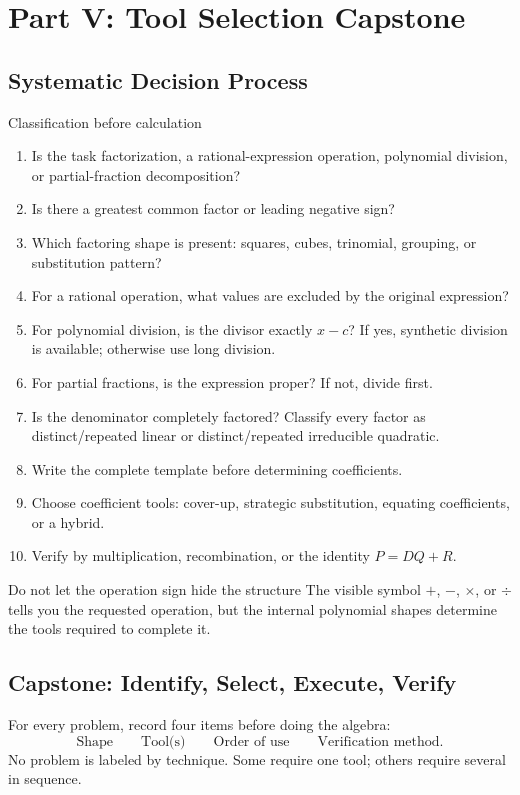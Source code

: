\documentclass[11pt,oneside]{book}
\begin{document}
\part{Part V: Tool Selection Capstone}
\chapter{Systematic Decision Process}
\begin{rulebox}{Classification before calculation}
\begin{enumerate}[leftmargin=*]
\item Is the task factorization, a rational-expression operation, polynomial division, or partial-fraction decomposition?
\item Is there a greatest common factor or leading negative sign?
\item Which factoring shape is present: squares, cubes, trinomial, grouping, or substitution pattern?
\item For a rational operation, what values are excluded by the original expression?
\item For polynomial division, is the divisor exactly $x-c$? If yes, synthetic division is available; otherwise use long division.
\item For partial fractions, is the expression proper? If not, divide first.
\item Is the denominator completely factored? Classify every factor as distinct/repeated linear or distinct/repeated irreducible quadratic.
\item Write the complete template before determining coefficients.
\item Choose coefficient tools: cover-up, strategic substitution, equating coefficients, or a hybrid.
\item Verify by multiplication, recombination, or the identity $P=DQ+R$.
\end{enumerate}
\end{rulebox}
\begin{warningbox}{Do not let the operation sign hide the structure}
The visible symbol $+$, $-$, $\times$, or $\div$ tells you the requested operation, but the internal polynomial shapes determine the tools required to complete it.
\end{warningbox}
\chapter{Capstone: Identify, Select, Execute, Verify}
For every problem, record four items before doing the algebra:
\[
\text{Shape}\qquad\text{Tool(s)}\qquad\text{Order of use}\qquad\text{Verification method}.
\]
No problem is labeled by technique. Some require one tool; others require several in sequence.
\end{document}
